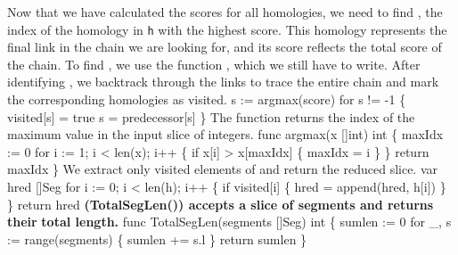 Now that we have calculated the scores for all homologies, we need to
find , the index of the homology in \texttt{h} with the highest
score. This homology represents the final link in the chain we are
looking for, and its score reflects the total score of the chain. To
find , we use the function , which we still have to
write. After identifying , we backtrack through the
 links to trace the entire chain and mark the
corresponding homologies as visited.
\nwenddocs{}\endmoddef\nwstartdeflinemarkup{}\nwenddeflinemarkup
s := argmax(score)
for s != -1 \{
          visited[s] = true
          s = predecessor[s]
\}
\nwendcode{}\nwdocspar
The function  returns the index of the maximum value in
the input slice of integers.
\nwenddocs{}\plusendmoddef\nwstartdeflinemarkup{}\nwenddeflinemarkup
func argmax(x []int) int \{
    maxIdx := 0
    for i := 1; i < len(x); i++ \{
          if x[i] > x[maxIdx] \{
              maxIdx = i
          \}
    \}
    return maxIdx
\}
\nwendcode{}\nwdocspar
We extract only visited elements of  and return the reduced
slice.
\nwenddocs{}\endmoddef\nwstartdeflinemarkup{}\nwenddeflinemarkup
var hred []Seg
for i := 0; i < len(h); i++ \{
          if visited[i] \{
                  hred = append(hred, h[i])
          \}
\}
return hred
\nwendcode{}\nwdocspar
\textbf{\ty(TotalSegLen()) accepts a slice of segments and returns their}
\textbf{total length.}
\nwenddocs{}\endmoddef\nwstartdeflinemarkup{}\nwenddeflinemarkup
func TotalSegLen(segments []Seg) int \{
          sumlen := 0
          for _, s := range(segments) \{
                  sumlen += s.l
          \}
          return sumlen
\}
\nwendcode{}\nwdocspar
